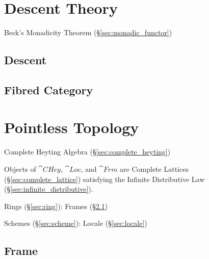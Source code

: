\section{Descent Theory}\label{sec:descent_theory}

Beck's Monadicity Theorem (\S\ref{sec:monadic_functor})



\subsection{Descent}\label{sec:descent}

\subsection{Fibred Category}\label{sec:fibred_category}



\section{Pointless Topology}\label{sec:pointless_topology}

Complete Heyting Algebra (\S\ref{sec:complete_heyting})

Objects of $\cat{CHey}$, $\cat{Loc}$, and $\cat{Frm}$ are Complete
Lattices (\S\ref{sec:complete_lattice}) satisfying the Infinite
Distributive Law (\S\ref{sec:infinite_distributive}).

Rings (\S\ref{sec:ring}): Frames (\S\ref{sec:frame})

Schemes (\S\ref{sec:scheme}): Locale (\S\ref{sec:locale})



\subsection{Frame}\label{sec:frame}

